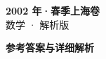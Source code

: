 \documentclass[zihao=-4, a4paper]{ctexart}
\begin{document}
\begin{center}
  {\Large\bfseries 2002 年·春季上海卷}\\[4pt]
  {\large 数学 · 解析版}
\end{center}
\medskip
{}

\clearpage
{}
\begin{center}{\Large\bfseries 参考答案与详细解析}\end{center}
\medskip

\end{document}
